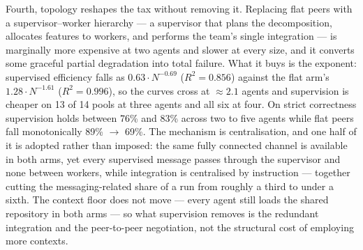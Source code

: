 \documentclass[11pt,a4paper]{article}
\begin{document}
Fourth, topology reshapes the tax without removing it. Replacing flat peers with a supervisor--worker hierarchy --- a supervisor that plans the decomposition, allocates features to workers, and performs the team's single integration --- is marginally more expensive at two agents and slower at every size, and it converts some graceful partial degradation into total failure. What it buys is the exponent: supervised efficiency falls as $0.63 \cdot N^{-0.69}$ ($R^2 = 0.856$) against the flat arm's $1.28 \cdot N^{-1.61}$ ($R^2 = 0.996$), so the curves cross at ${\approx}2.1$ agents and supervision is cheaper on 13 of 14 pools at three agents and all six at four. On strict correctness supervision holds between 76\% and 83\% across two to five agents while flat peers fall monotonically 89\% $\rightarrow$ 69\%. The mechanism is centralisation, and one half of it is adopted rather than imposed: the same fully connected channel is available in both arms, yet every supervised message passes through the supervisor and none between workers, while integration is centralised by instruction --- together cutting the messaging-related share of a run from roughly a third to under a sixth. The context floor does not move --- every agent still loads the shared repository in both arms --- so what supervision removes is the redundant integration and the peer-to-peer negotiation, not the structural cost of employing more contexts.
\end{document}

